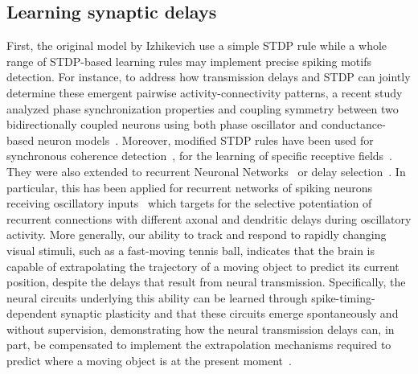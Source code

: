 \documentclass[brainsci, %
               review,submit,pdftex,moreauthors
               ]{Definitions/mdpi}
\begin{document}
\subsection{Learning synaptic delays}
First, the original model by Izhikevich use a simple STDP rule while a whole range of STDP-based learning rules may implement precise spiking motifs detection. For instance, to address how transmission delays and STDP can jointly determine these emergent pairwise activity-connectivity patterns, a recent study analyzed phase synchronization properties and coupling symmetry between two bidirectionally coupled neurons using both phase oscillator and conductance-based neuron models~\citep{madadi_asl_delay-dependent_2022}. Moreover, modified STDP rules have been used for synchronous coherence detection~\citep{perrinet_coherence_2002}, for the learning of specific receptive fields~\citep{perrinet_networks_2001}. They were also extended to recurrent Neuronal Networks~\citep{gilson_stdp_2010} or delay selection~\citep{datadien_right_2011}. In particular, this has been applied for recurrent networks of spiking neurons receiving oscillatory inputs~\citep{kerr_delay_2013} which targets for the selective potentiation of recurrent connections with different axonal and dendritic delays during oscillatory activity. More generally, our ability to track and respond to rapidly changing visual stimuli, such as a fast-moving tennis ball, indicates that the brain is capable of extrapolating the trajectory of a moving object to predict its current position, despite the delays that result from neural transmission. Specifically, the neural circuits underlying this ability can be learned through spike-timing-dependent synaptic plasticity and that these circuits emerge spontaneously and without supervision, demonstrating how the neural transmission delays can, in part, be compensated to implement the extrapolation mechanisms required to predict where a moving object is at the present moment~\citep{burkitt_predictive_2021}.
\end{document}
